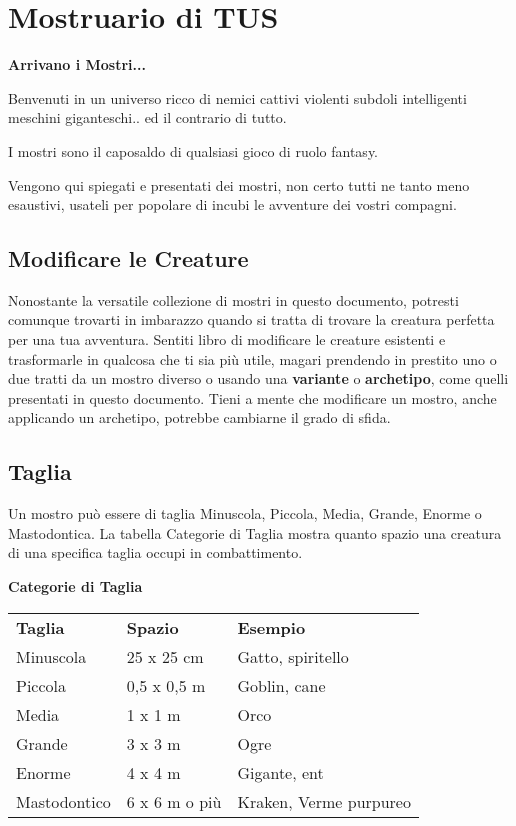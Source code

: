 
\section{Mostruario di TUS}

\textbf{Arrivano i Mostri...}

Benvenuti in un universo ricco di nemici cattivi violenti subdoli intelligenti meschini giganteschi.. ed il contrario di tutto.

I mostri sono il caposaldo di qualsiasi gioco di ruolo fantasy.

Vengono qui spiegati e presentati dei mostri, non certo tutti ne tanto meno esaustivi, usateli per popolare di incubi le avventure dei vostri compagni.

\subsection{Modificare le Creature}

Nonostante la versatile collezione di mostri in questo documento, potresti comunque trovarti in imbarazzo quando si tratta di trovare la creatura perfetta per una tua avventura. Sentiti libro di modificare le creature esistenti e trasformarle in qualcosa che ti sia più utile, magari prendendo in prestito uno o due tratti da un mostro diverso o usando una \textbf{variante} o \textbf{archetipo}, come quelli presentati in questo documento. Tieni a mente che modificare un mostro, anche applicando un archetipo, potrebbe cambiarne il grado di sfida. 

\subsection{Taglia}

Un mostro può essere di taglia Minuscola, Piccola, Media, Grande, Enorme o Mastodontica. La tabella Categorie di Taglia mostra quanto spazio una creatura di una specifica taglia occupi in combattimento.

\medskip

\textbf{Categorie di Taglia}

\begin{tabular}{lll}
\toprule
\textbf{Taglia}& \textbf{Spazio} & \textbf{Esempio}\\
Minuscola & 25 x 25 cm& Gatto, spiritello\\
Piccola & 0,5 x 0,5 m & Goblin, cane\\
Media & 1 x 1 m & Orco\\
Grande & 3 x 3 m& Ogre\\
Enorme & 4 x 4 m & Gigante, ent\\
Mastodontico & 6 x 6 m o più&Kraken, Verme purpureo\\
\end{tabular}


